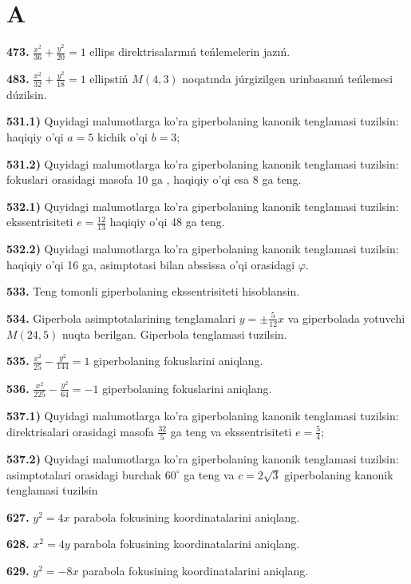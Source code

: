 \section{A}\label{a}

\textbf{473.} $\frac{x^{2}}{36} + \frac{y^{2}}{20} = 1$ ellips direktrisalarınıń teńlemelerin jazıń.

\textbf{483.} $\frac{x^{2}}{32} + \frac{y^{2}}{18} = 1$ ellipstiń $M (4,3) $ noqatında júrgizilgen urinbasınıń teńlemesi dúzilsin.

\textbf{531.1)} Quyidagi malumotlarga ko'ra giperbolaning kanonik tenglamasi tuzilsin: haqiqiy o'qi $a = 5$ kichik o'qi $b = 3$;

\textbf{531.2)} Quyidagi malumotlarga ko'ra giperbolaning kanonik tenglamasi tuzilsin: fokuslari orasidagi masofa 10 ga , haqiqiy o'qi esa 8 ga teng.

\textbf{532.1)} Quyidagi malumotlarga ko'ra giperbolaning kanonik tenglamasi tuzilsin: ekssentrisiteti $e = \frac{12}{13}$ haqiqiy o'qi 48 ga teng.

\textbf{532.2)} Quyidagi malumotlarga ko'ra giperbolaning kanonik tenglamasi tuzilsin: haqiqiy o'qi 16 ga, asimptotasi bilan abssissa o'qi orasidagi $\varphi$.

\textbf{533.} Teng tomonli giperbolaning ekssentrisiteti hisoblansin.

\textbf{534.} Giperbola asimptotalarining tenglamalari $y = \pm \frac{5}{12}x$ va giperbolada yotuvchi $M(24,5)$ nuqta berilgan. Giperbola tenglamasi tuzilsin.

\textbf{535.} $\frac{x^{2}}{25} - \frac{y^{2}}{144} = 1$ giperbolaning fokuslarini aniqlang.

\textbf{536.} $\frac{x^{2}}{225} - \frac{y^{2}}{64} = - 1$ giperbolaning fokuslarini aniqlang.

\textbf{537.1)} Quyidagi malumotlarga ko'ra giperbolaning kanonik tenglamasi tuzilsin: direktrisalari orasidagi masofa $\frac{32}{5}$ ga teng va ekssentrisiteti $e = \frac{5}{4}$;

\textbf{537.2)} Quyidagi malumotlarga ko'ra giperbolaning kanonik tenglamasi tuzilsin: asimptotalari orasidagi burchak $60^{\circ}$ ga teng va $c = 2\sqrt{3}$ giperbolaning kanonik tenglamasi tuzilsin

\textbf{627.} $y^{2} = 4x$ parabola fokusining koordinatalarini aniqlang.

\textbf{628.} $x^{2} = 4y$ parabola fokusining koordinatalarini aniqlang.

\textbf{629.} $y^{2} = - 8x$ parabola fokusining koordinatalarini aniqlang.

